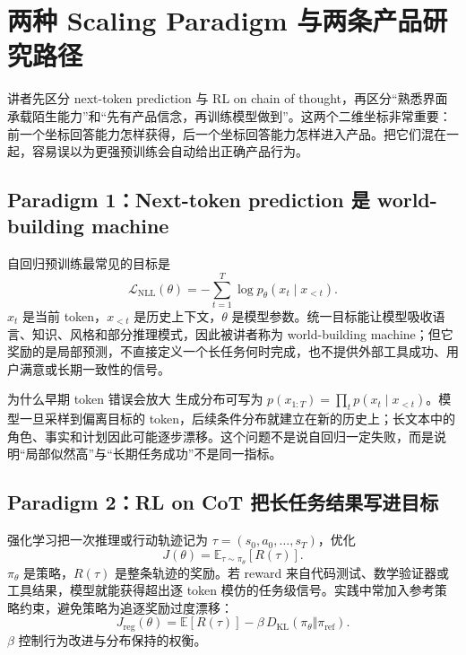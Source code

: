 \section{两种 Scaling Paradigm 与两条产品研究路径}

讲者先区分 next-token prediction 与 RL on chain of thought，再区分“熟悉界面承载陌生能力”和“先有产品信念，再训练模型做到”。这两个二维坐标非常重要：前一个坐标回答能力怎样获得，后一个坐标回答能力怎样进入产品。把它们混在一起，容易误以为更强预训练会自动给出正确产品行为。

\subsection{Paradigm 1：Next-token prediction 是 world-building machine}

自回归预训练最常见的目标是
\[
\mathcal{L}_{\text{NLL}}(\theta)
=-\sum_{t=1}^{T}\log p_{\theta}(x_t\mid x_{<t}).
\]
$x_t$ 是当前 token，$x_{<t}$ 是历史上下文，$\theta$ 是模型参数。统一目标能让模型吸收语言、知识、风格和部分推理模式，因此被讲者称为 world-building machine；但它奖励的是局部预测，不直接定义一个长任务何时完成，也不提供外部工具成功、用户满意或长期一致性的信号。


\begin{knowledgebox}{为什么早期 token 错误会放大}
生成分布可写为 $p(x_{1:T})=\prod_t p(x_t\mid x_{<t})$。模型一旦采样到偏离目标的 token，后续条件分布就建立在新的历史上；长文本中的角色、事实和计划因此可能逐步漂移。这个问题不是说自回归一定失败，而是说明“局部似然高”与“长期任务成功”不是同一指标。
\end{knowledgebox}

\subsection{Paradigm 2：RL on CoT 把长任务结果写进目标}

强化学习把一次推理或行动轨迹记为 $\tau=(s_0,a_0,\dots,s_T)$，优化
\[
J(\theta)=\mathbb{E}_{\tau\sim\pi_{\theta}}[R(\tau)].
\]
$\pi_\theta$ 是策略，$R(\tau)$ 是整条轨迹的奖励。若 reward 来自代码测试、数学验证器或工具结果，模型就能获得超出逐 token 模仿的任务级信号。实践中常加入参考策略约束，避免策略为追逐奖励过度漂移：
\[
J_{\text{reg}}(\theta)=\mathbb{E}[R(\tau)]
-\beta\,D_{\mathrm{KL}}(\pi_{\theta}\Vert\pi_{\mathrm{ref}}).
\]
$\beta$ 控制行为改进与分布保持的权衡。


